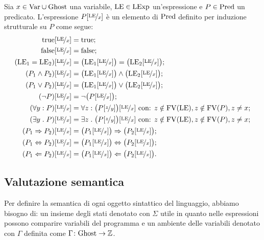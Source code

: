\begin{definizione} 
Sia $x \in \mathrm{Var} \cup \mathrm{Ghost}$ una variabile, $\mathrm{LE} \in \mathrm{LExp}$ un'espressione
e $P \in \mathrm{Pred}$ un predicato.
L'espressione $P[\nicefrac{\mathrm{LE}}{x}]$ è un elemento di $\mathrm{Pred}$ definito
per induzione strutturale su $P$ come segue:
\begin{align*}
  \mathrm{true}[\nicefrac{\mathrm{LE}}{x}]
    &= \mathrm{true};\\
  \mathrm{false}[\nicefrac{\mathrm{LE}}{x}]
    &= \mathrm{false};\\
  (\mathrm{LE}_1 = \mathrm{LE}_2)[\nicefrac{\mathrm{LE}}{x}]
    &= \bigl(\mathrm{LE}_1[\nicefrac{\mathrm{LE}}{x}]\bigr) = \bigl(\mathrm{LE}_2[\nicefrac{\mathrm{LE}}{x}]\bigr);\\
  (P_1 \land P_2)[\nicefrac{\mathrm{LE}}{x}]
    &= \bigl(\mathrm{LE}_1[\nicefrac{\mathrm{LE}}{x}]\bigr) \land \bigl(\mathrm{LE}_2[\nicefrac{\mathrm{LE}}{x}]\bigr);\\
  (P_1 \lor P_2)[\nicefrac{\mathrm{LE}}{x}]
    &= \bigl(\mathrm{LE}_1[\nicefrac{\mathrm{LE}}{x}]\bigr) \lor \bigl(\mathrm{LE}_2[\nicefrac{\mathrm{LE}}{x}]\bigr);\\
  (\neg P)[\nicefrac{\mathrm{LE}}{x}]
    &= \neg \bigl(P [\nicefrac{\mathrm{LE}}{x}]\bigr);\\
  (\forall y\mathrel{:} P)[\nicefrac{\mathrm{LE}}{x}]
    &= \forall z\mathrel{:} \bigl(P [\nicefrac{z}{y}]\bigr)[\nicefrac{\mathrm{LE}}{x}] \text{ con: $z\notin\mathrm{FV}(\mathrm{LE}), z\notin\mathrm{FV}(P), z\neq x$};\\
  (\exists  y\mathrel{.} P)[\nicefrac{\mathrm{LE}}{x}]
    &= \exists z\mathrel{.} \bigl(P [\nicefrac{z}{y}]\bigr)[\nicefrac{\mathrm{LE}}{x}] \text{ con: $z\notin\mathrm{FV}(\mathrm{LE}), z\notin\mathrm{FV}(P), z\neq x$};\\
  (P_1 \Rightarrow P_2)[\nicefrac{\mathrm{LE}}{x}]
    &= \bigl(P_1[\nicefrac{\mathrm{LE}}{x}]\bigr) \Rightarrow \bigl(P_2[\nicefrac{\mathrm{LE}}{x}]\bigr);\\
  (P_1 \Leftrightarrow P_2)[\nicefrac{\mathrm{LE}}{x}]
    &= \bigl(P_1[\nicefrac{\mathrm{LE}}{x}]\bigr) \Leftrightarrow \bigl(P_2[\nicefrac{\mathrm{LE}}{x}]\bigr);\\
  (P_1 \Leftarrow P_2)[\nicefrac{\mathrm{LE}}{x}]
    &= \bigl(P_1[\nicefrac{\mathrm{LE}}{x}]\bigr) \Leftarrow \bigl(P_2[\nicefrac{\mathrm{LE}}{x}]\bigr).
\end{align*}
\end{definizione}

\subsection{Valutazione semantica}
Per definire la semantica di ogni oggetto sintattico del linguaggio,
abbiamo bisogno di: un insieme degli stati denotato con $\Sigma$ utile in quanto nelle espressioni possono comparire variabili del programma e un ambiente delle variabili denotato con $\Gamma$
definita come $\mathord{\Gamma}\colon\mathrm{Ghost}\to\mathbb{Z}$.

